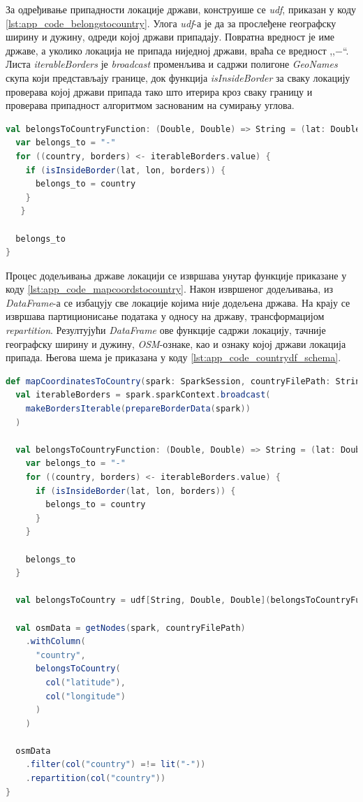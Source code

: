 \documentclass[12pt,oneside]{memoir}
\begin{document}

За одређивање припадности локације држави, конструише се \textit{udf}, приказан у коду \ref{lst:app_code_belongstocountry}. Улога \textit{udf}-а је да за прослеђене географску ширину и дужину, одреди којој држави припадају. Повратна вредност је име државе, а уколико локација не припада ниједној држави, враћа се вредност ,,$-$``. Листа \textit{iterableBorders} је \textit{broadcast} променљива и садржи полигоне \textit{GeoNames} скупа који представљају границе, док функција \textit{isInsideBorder} за сваку локацију проверава којој држави припада тако што итерира кроз сваку границу и проверава припадност алгоритмом заснованим на сумирању углова.

\begin{lstlisting}[caption={Функција која додељује државу локацији}, language=Scala, label={lst:app_code_belongstocountry}]
val belongsToCountryFunction: (Double, Double) => String = (lat: Double, lon: Double) => {
  var belongs_to = "-"
  for ((country, borders) <- iterableBorders.value) {
    if (isInsideBorder(lat, lon, borders)) {
      belongs_to = country
    }
   }

  belongs_to
}
\end{lstlisting}

Процес додељивања државе локацији се извршава унутар функције приказане у коду \ref{lst:app_code_mapcoordstocountry}. Након извршеног додељивања, из \textit{DataFrame}-а се избацују све локације којима није додељена држава. На крају се извршава партиционисање података у односу на државу, трансформацијом \textit{repartition}. Резултујући \textit{DataFrame} ове функције садржи локацију, тачније географску ширину и дужину, \textit{OSM}-ознаке, као и ознаку којој држави локација припада. Његова шема је приказана у коду \ref{lst:app_code_countrydf_schema}.

\begin{lstlisting}[caption={Функција \textit{mapCoordinatesToCountry}}, language=Scala, label={lst:app_code_mapcoordstocountry}]
def mapCoordinatesToCountry(spark: SparkSession, countryFilePath: String): DataFrame = {
  val iterableBorders = spark.sparkContext.broadcast(
    makeBordersIterable(prepareBorderData(spark))
  )

  val belongsToCountryFunction: (Double, Double) => String = (lat: Double, lon: Double) => {
    var belongs_to = "-"
    for ((country, borders) <- iterableBorders.value) {
      if (isInsideBorder(lat, lon, borders)) {
        belongs_to = country
      }
    }

    belongs_to
  }

  val belongsToCountry = udf[String, Double, Double](belongsToCountryFunction)

  val osmData = getNodes(spark, countryFilePath)
    .withColumn(
      "country",
      belongsToCountry(
        col("latitude"),
        col("longitude")
      )
    )

  osmData
    .filter(col("country") =!= lit("-"))
    .repartition(col("country"))
}
\end{lstlisting}
\end{document}
